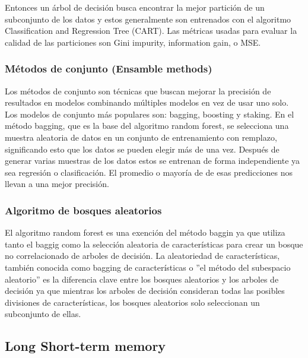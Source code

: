 Entonces un árbol de decisión busca encontrar la mejor partición de un subconjunto de los datos y estos generalmente son entrenados con el algoritmo Classification and Regression Tree (CART).
Las métricas usadas para evaluar la calidad de las particiones son Gini impurity, information gain, o MSE.   

\subsubsection{Métodos de conjunto (Ensamble methods)}

Los métodos de conjunto son técnicas que buscan mejorar la precisión de resultados en modelos combinando múltiples modelos en vez de usar uno solo. Los modelos de conjunto más populares son: bagging, boosting y staking.
En el método bagging, que es la base del algoritmo random forest, se selecciona una muestra aleatoria de datos en un conjunto de entrenamiento con remplazo, significando esto que los datos se pueden elegir más de una vez. Después de generar varias muestras de los datos estos se entrenan de forma independiente ya sea regresión o clasificación. El promedio o mayoría de de esas predicciones nos llevan a una mejor precisión.   

\subsubsection{Algoritmo de bosques aleatorios}

El algoritmo random forest es una exención del método baggin ya que utiliza tanto el baggig como la selección aleatoria de características para crear un bosque no correlacionado de arboles de decisión.
La aleatoriedad de características, también conocida como bagging de características o ''el método del subespacio aleatorio'' es la diferencia clave entre los bosques aleatorios y los arboles de decisión ya que mientras los arboles de decisión consideran todas las posibles divisiones de características, los bosques aleatorios solo seleccionan un subconjunto de ellas.


\subsection{Long Short-term memory}

